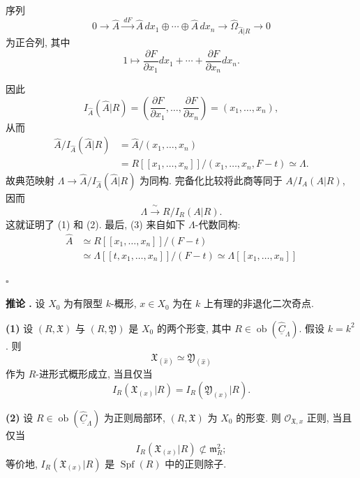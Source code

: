 序列
\[
0\longrightarrow\widehat A
 \xrightarrow{\ dF\ }
 \widehat A\,dx_1\oplus\cdots\oplus\widehat A\,dx_n
 \longrightarrow\widehat\Omega_{\widehat A|R}\longrightarrow0
\]
为正合列, 其中
\[
1\longmapsto
 \frac{\partial F}{\partial x_1}dx_1+\cdots+
 \frac{\partial F}{\partial x_n}dx_n.
\]


因此
\[
I_{\widehat A}(\widehat A|R)
=\left(\frac{\partial F}{\partial x_1},\ldots,
       \frac{\partial F}{\partial x_n}\right)
=(x_1,\ldots,x_n),
\]
从而
\[
\begin{aligned}
\widehat A/I_{\widehat A}(\widehat A|R)
&=\widehat A/(x_1,\ldots,x_n)\\
&=R[[x_1,\ldots,x_n]]/(x_1,\ldots,x_n,F-t)
 \simeq\Lambda.
\end{aligned}
\]
故典范映射 $\Lambda\longrightarrow
\widehat A/I_{\widehat A}(\widehat A|R)$ 为同构. 完备化比较将此商等同于 $A/I_A(A|R)$, 因而
\[
\Lambda\xrightarrow{\ \sim\ }R/I_R(A|R).
\]
这就证明了 (1) 和 (2). 最后, (3) 来自如下 $\Lambda$-代数同构:
\[
\begin{aligned}
\widehat A
&\simeq R[[x_1,\ldots,x_n]]/(F-t)\\
&\simeq\Lambda[[t,x_1,\ldots,x_n]]/(F-t)
 \simeq\Lambda[[x_1,\ldots,x_n]]
\end{aligned}
\]

\hfill$\square$


\par\medskip
\noindent\textbf{推论 .}
设 $X_0$ 为有限型 $k$-概形, $x\in X_0$ 为在 $k$ 上有理的非退化二次奇点.

\smallskip
\noindent\textbf{(1)} 设 $(R,\mathfrak X)$ 与 $(R,\mathfrak Y)$ 是 $X_0$ 的两个形变, 其中 $R\in\operatorname{ob}(\widehat{\underline C}_\Lambda)$. 假设 $k=k^2$. 则
\[
\mathfrak X_{(\widehat x)}\simeq
\mathfrak Y_{(\widehat x)}
\]
作为 $R$-进形式概形成立, 当且仅当
\[
I_R(\mathfrak X_{(x)}|R)=I_R(\mathfrak Y_{(x)}|R).
\]

\smallskip
\noindent\textbf{(2)} 设 $R\in\operatorname{ob}(\widehat{\underline C}_\Lambda)$ 为正则局部环, $(R,\mathfrak X)$ 为 $X_0$ 的形变. 则 $\mathcal O_{\mathfrak X,x}$ 正则, 当且仅当
\[
I_R(\mathfrak X_{(x)}|R)\not\subset\mathfrak m_R^2;
\]
等价地, $I_R(\mathfrak X_{(x)}|R)$ 是 $\operatorname{Spf}(R)$ 中的正则除子.

